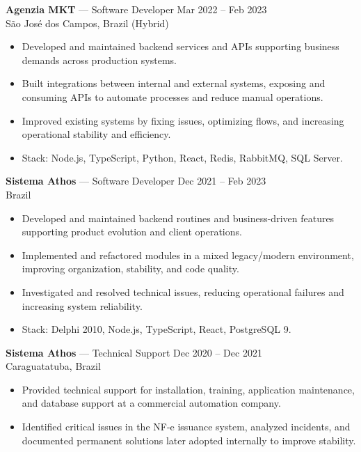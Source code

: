 \documentclass[11pt,a4paper]{article}
\begin{document}
\vspace{8pt}
\textbf{Agenzia MKT} — Software Developer \hfill Mar 2022 – Feb 2023 \\
São José dos Campos, Brazil (Hybrid)
\vspace{-4pt}
\begin{itemize}[leftmargin=*]
  \item Developed and maintained backend services and APIs supporting business demands across production systems.
  \item Built integrations between internal and external systems, exposing and consuming APIs to automate processes and reduce manual operations.
  \item Improved existing systems by fixing issues, optimizing flows, and increasing operational stability and efficiency.
  \item Stack: Node.js, TypeScript, Python, React, Redis, RabbitMQ, SQL Server.
\end{itemize}

\vspace{8pt}
\textbf{Sistema Athos} — Software Developer \hfill Dec 2021 – Feb 2023 \\
Brazil
\vspace{-4pt}
\begin{itemize}[leftmargin=*]
  \item Developed and maintained backend routines and business-driven features supporting product evolution and client operations.
  \item Implemented and refactored modules in a mixed legacy/modern environment, improving organization, stability, and code quality.
  \item Investigated and resolved technical issues, reducing operational failures and increasing system reliability.
  \item Stack: Delphi 2010, Node.js, TypeScript, React, PostgreSQL 9.
\end{itemize}

\vspace{8pt}
\textbf{Sistema Athos} — Technical Support \hfill Dec 2020 – Dec 2021 \\
Caraguatatuba, Brazil
\vspace{-4pt}
\begin{itemize}[leftmargin=*]
  \item Provided technical support for installation, training, application maintenance, and database support at a commercial automation company.
  \item Identified critical issues in the NF-e issuance system, analyzed incidents, and documented permanent solutions later adopted internally to improve stability.
\end{itemize}
\end{document}
